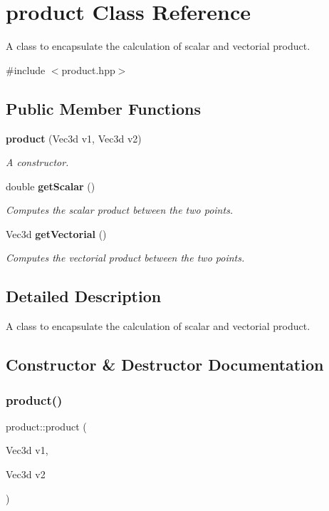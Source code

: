 \section{product Class Reference}
\label{classproduct}


A class to encapsulate the calculation of scalar and vectorial product.  




{\ttfamily \#include $<$product.\+hpp$>$}

\subsection*{Public Member Functions}
\begin{DoxyCompactItemize}
\item 
\textbf{ product} (Vec3d v1, Vec3d v2)
\begin{DoxyCompactList}\small\item\em A constructor. \end{DoxyCompactList}\item 
double \textbf{ get\+Scalar} ()
\begin{DoxyCompactList}\small\item\em Computes the scalar product between the two points. \end{DoxyCompactList}\item 
Vec3d \textbf{ get\+Vectorial} ()
\begin{DoxyCompactList}\small\item\em Computes the vectorial product between the two points. \end{DoxyCompactList}\end{DoxyCompactItemize}


\subsection{Detailed Description}
A class to encapsulate the calculation of scalar and vectorial product. 

\subsection{Constructor \& Destructor Documentation}
\mbox{\label{classproduct_afb6d2aba360c4daeacef569a7e884689}} 
\subsubsection{product()}
{\footnotesize\ttfamily product\+::product (\begin{DoxyParamCaption}\item[{Vec3d}]{v1,  }\item[{Vec3d}]{v2 }\end{DoxyParamCaption})}




